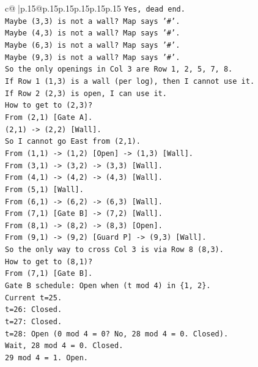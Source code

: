 \documentclass{article}
\begin{document}
{\begin{supertabular}{c@{$\;$}|p{.15\linewidth}@{}p{.15\linewidth}p{.15\linewidth}p{.15\linewidth}p{.15\linewidth}p{.15\linewidth}}
{{{\texttt{Yes, dead end.} \\
\texttt{Maybe (3,3) is not a wall? Map says '\#'.} \\
\texttt{Maybe (4,3) is not a wall? Map says '\#'.} \\
\texttt{Maybe (6,3) is not a wall? Map says '\#'.} \\
\texttt{Maybe (9,3) is not a wall? Map says '\#'.} \\
\texttt{So the only openings in Col 3 are Row 1, 2, 5, 7, 8.} \\
\texttt{If Row 1 (1,3) is a wall (per log), then I cannot use it.} \\
\texttt{If Row 2 (2,3) is open, I can use it.} \\
\texttt{How to get to (2,3)?} \\
\texttt{From (2,1) {[}Gate A{]}.} \\
\texttt{(2,1) {-}> (2,2) {[}Wall{]}.} \\
\texttt{So I cannot go East from (2,1).} \\
\texttt{From (1,1) {-}> (1,2) {[}Open{]} {-}> (1,3) {[}Wall{]}.} \\
\texttt{From (3,1) {-}> (3,2) {-}> (3,3) {[}Wall{]}.} \\
\texttt{From (4,1) {-}> (4,2) {-}> (4,3) {[}Wall{]}.} \\
\texttt{From (5,1) {[}Wall{]}.} \\
\texttt{From (6,1) {-}> (6,2) {-}> (6,3) {[}Wall{]}.} \\
\texttt{From (7,1) {[}Gate B{]} {-}> (7,2) {[}Wall{]}.} \\
\texttt{From (8,1) {-}> (8,2) {-}> (8,3) {[}Open{]}.} \\
\texttt{From (9,1) {-}> (9,2) {[}Guard P{]} {-}> (9,3) {[}Wall{]}.} \\
\texttt{So the only way to cross Col 3 is via Row 8 (8,3).} \\
\texttt{How to get to (8,1)?} \\
\texttt{From (7,1) {[}Gate B{]}.} \\
\texttt{Gate B schedule: Open when (t mod 4) in \{1, 2\}.} \\
\texttt{Current t=25.} \\
\texttt{t=26: Closed.} \\
\texttt{t=27: Closed.} \\
\texttt{t=28: Open (0 mod 4 = 0? No, 28 mod 4 = 0. Closed).} \\
\texttt{Wait, 28 mod 4 = 0. Closed.} \\
\texttt{29 mod 4 = 1. Open.} \\
}}}
\end{supertabular}}
\end{document}

